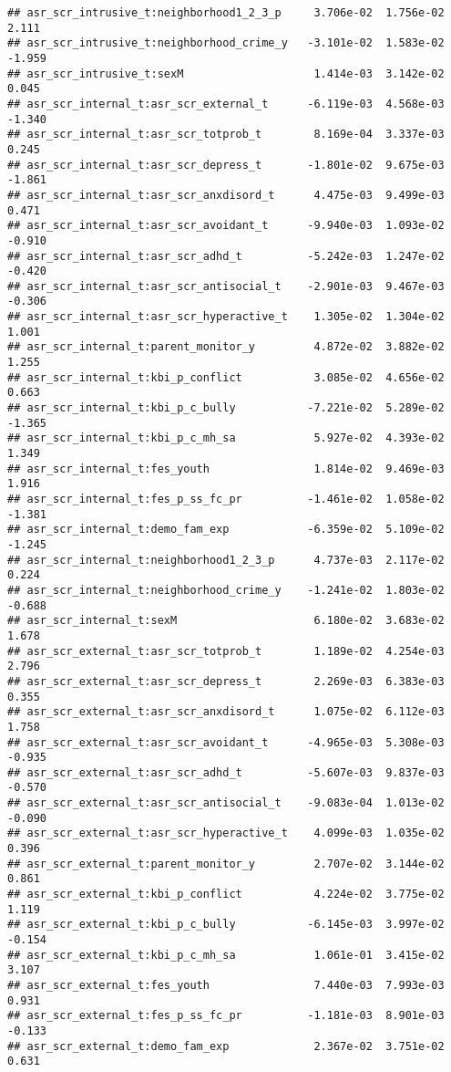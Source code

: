 \documentclass[
]{article}
\begin{document}
\begin{verbatim}
## asr_scr_intrusive_t:neighborhood1_2_3_p     3.706e-02  1.756e-02   2.111
## asr_scr_intrusive_t:neighborhood_crime_y   -3.101e-02  1.583e-02  -1.959
## asr_scr_intrusive_t:sexM                    1.414e-03  3.142e-02   0.045
## asr_scr_internal_t:asr_scr_external_t      -6.119e-03  4.568e-03  -1.340
## asr_scr_internal_t:asr_scr_totprob_t        8.169e-04  3.337e-03   0.245
## asr_scr_internal_t:asr_scr_depress_t       -1.801e-02  9.675e-03  -1.861
## asr_scr_internal_t:asr_scr_anxdisord_t      4.475e-03  9.499e-03   0.471
## asr_scr_internal_t:asr_scr_avoidant_t      -9.940e-03  1.093e-02  -0.910
## asr_scr_internal_t:asr_scr_adhd_t          -5.242e-03  1.247e-02  -0.420
## asr_scr_internal_t:asr_scr_antisocial_t    -2.901e-03  9.467e-03  -0.306
## asr_scr_internal_t:asr_scr_hyperactive_t    1.305e-02  1.304e-02   1.001
## asr_scr_internal_t:parent_monitor_y         4.872e-02  3.882e-02   1.255
## asr_scr_internal_t:kbi_p_conflict           3.085e-02  4.656e-02   0.663
## asr_scr_internal_t:kbi_p_c_bully           -7.221e-02  5.289e-02  -1.365
## asr_scr_internal_t:kbi_p_c_mh_sa            5.927e-02  4.393e-02   1.349
## asr_scr_internal_t:fes_youth                1.814e-02  9.469e-03   1.916
## asr_scr_internal_t:fes_p_ss_fc_pr          -1.461e-02  1.058e-02  -1.381
## asr_scr_internal_t:demo_fam_exp            -6.359e-02  5.109e-02  -1.245
## asr_scr_internal_t:neighborhood1_2_3_p      4.737e-03  2.117e-02   0.224
## asr_scr_internal_t:neighborhood_crime_y    -1.241e-02  1.803e-02  -0.688
## asr_scr_internal_t:sexM                     6.180e-02  3.683e-02   1.678
## asr_scr_external_t:asr_scr_totprob_t        1.189e-02  4.254e-03   2.796
## asr_scr_external_t:asr_scr_depress_t        2.269e-03  6.383e-03   0.355
## asr_scr_external_t:asr_scr_anxdisord_t      1.075e-02  6.112e-03   1.758
## asr_scr_external_t:asr_scr_avoidant_t      -4.965e-03  5.308e-03  -0.935
## asr_scr_external_t:asr_scr_adhd_t          -5.607e-03  9.837e-03  -0.570
## asr_scr_external_t:asr_scr_antisocial_t    -9.083e-04  1.013e-02  -0.090
## asr_scr_external_t:asr_scr_hyperactive_t    4.099e-03  1.035e-02   0.396
## asr_scr_external_t:parent_monitor_y         2.707e-02  3.144e-02   0.861
## asr_scr_external_t:kbi_p_conflict           4.224e-02  3.775e-02   1.119
## asr_scr_external_t:kbi_p_c_bully           -6.145e-03  3.997e-02  -0.154
## asr_scr_external_t:kbi_p_c_mh_sa            1.061e-01  3.415e-02   3.107
## asr_scr_external_t:fes_youth                7.440e-03  7.993e-03   0.931
## asr_scr_external_t:fes_p_ss_fc_pr          -1.181e-03  8.901e-03  -0.133
## asr_scr_external_t:demo_fam_exp             2.367e-02  3.751e-02   0.631

\end{verbatim}
\end{document}
